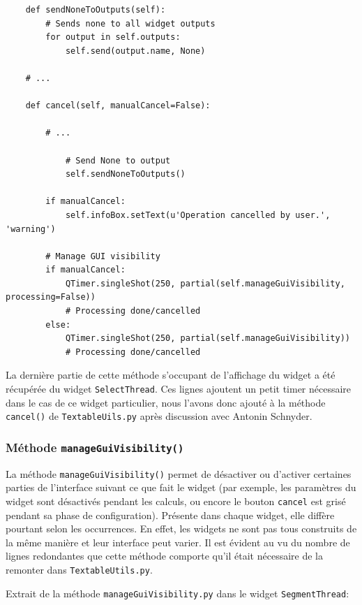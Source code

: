 \documentclass{article}
\begin{document}
\begin{verbatim}
    def sendNoneToOutputs(self):
        # Sends none to all widget outputs
        for output in self.outputs:
            self.send(output.name, None)

    # ...

    def cancel(self, manualCancel=False):

        # ...
            
            # Send None to output
            self.sendNoneToOutputs()
            
        if manualCancel:
            self.infoBox.setText(u'Operation cancelled by user.', 'warning')
            
        # Manage GUI visibility
        if manualCancel:
            QTimer.singleShot(250, partial(self.manageGuiVisibility, processing=False)) 
            # Processing done/cancelled
        else:
            QTimer.singleShot(250, partial(self.manageGuiVisibility)) 
            # Processing done/cancelled
\end{verbatim}

La dernière partie de cette méthode s'occupant de l'affichage du widget a été récupérée du widget \texttt{SelectThread}. Ces lignes ajoutent un petit timer nécessaire dans le cas de ce widget particulier, nous l'avons donc ajouté à la méthode \texttt{cancel()} de \texttt{TextableUils.py} après discussion avec Antonin Schnyder.

\subsubsection{Méthode \texttt{manageGuiVisibility()}}

La méthode \texttt{manageGuiVisibility()} permet de désactiver ou d'activer certaines parties de l'interface suivant ce que fait le widget (par exemple, les paramètres du widget sont désactivés pendant les calculs, ou encore le bouton \texttt{cancel} est grisé pendant sa phase de configuration). 
Présente dans chaque widget, elle diffère pourtant selon les occurrences. En effet, les widgets ne sont pas tous construits de la même manière et leur interface peut varier. Il est évident au vu du nombre de lignes redondantes que cette méthode comporte qu'il était nécessaire de la remonter dans \texttt{TextableUtils.py}.
\newline

Extrait de la méthode \texttt{manageGuiVisibility.py} dans le widget \texttt{SegmentThread}:
\end{document}
